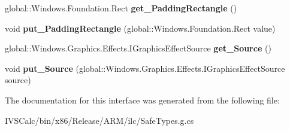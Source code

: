 \begin{DoxyCompactItemize}
global\+::\+Windows.\+Foundation.\+Rect {\bfseries get\+\_\+\+Padding\+Rectangle} ()
\item 
\mbox{\label{interface_microsoft_1_1_graphics_1_1_canvas_1_1_effects_1_1_i_atlas_effect_ae8547dbe3cad6fcce77f4a55bd9392be}} 
void {\bfseries put\+\_\+\+Padding\+Rectangle} (global\+::\+Windows.\+Foundation.\+Rect value)
\item 
\mbox{\label{interface_microsoft_1_1_graphics_1_1_canvas_1_1_effects_1_1_i_atlas_effect_a6c75904e9cca0dba312800b7ed419978}} 
global\+::\+Windows.\+Graphics.\+Effects.\+I\+Graphics\+Effect\+Source {\bfseries get\+\_\+\+Source} ()
\item 
\mbox{\label{interface_microsoft_1_1_graphics_1_1_canvas_1_1_effects_1_1_i_atlas_effect_a7813198d1247fd31acb6aaf1aa5bf8db}} 
void {\bfseries put\+\_\+\+Source} (global\+::\+Windows.\+Graphics.\+Effects.\+I\+Graphics\+Effect\+Source source)
\end{DoxyCompactItemize}


The documentation for this interface was generated from the following file\+:\begin{DoxyCompactItemize}
\item 
I\+V\+S\+Calc/bin/x86/\+Release/\+A\+R\+M/ilc/Safe\+Types.\+g.\+cs\end{DoxyCompactItemize}

